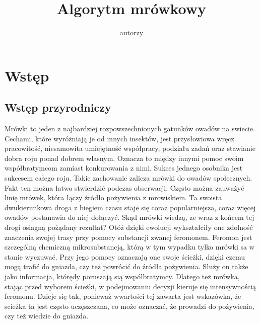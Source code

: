 \documentclass[printmode, openany, oneside, eng]{mgr}
\title{Algorytm mrówkowy}
\author{autorzy}
\begin{document}

\maketitle %
\chapter{Wstęp} \label{chap:wstep}

\section{Wstęp przyrodniczy}\label{sec:przedmowa}
Mrówki  to jeden z najbardziej rozpowszechnionych gatunków owadów na swiecie. Cechami, które wyróżniają je od innych
insektów, jest przysłowiowa wręcz pracowitość, niesamowita umiejętność współpracy, podziału zadań oraz stawianie dobra roju
ponad dobrem wlasnym. Oznacza to między innymi pomoc swoim współbratymcom zamiast konkurowania z nimi. Sukces jednego
osobnika jest sukcesem całego roju. Takie zachowanie zalicza mrówki do owadów społecznych.
Fakt ten można łatwo stwierdzić podczas obserwacji. Często można zauważyć linię mrówek, która łączy źródło
pożywienia z mrowiskiem. Ta swoista dwukierunkowa droga z biegiem czasu staje się coraz popularniejsza, coraz więcej
owadów postanawia do niej dołączyć. Skąd mrówki wiedzą, ze wraz z końcem tej drogi osiagną pożądany rezultat? Otóż dzięki ewolucji wykształciły one zdolność znaczenia swojej trasy przy pomocy substancji zwanej feromonem.
\newline Feromon jest szczególną chemiczną mikrosubstancją, którą w tym wypadku tylko mrówki sa w stanie wyczuwać. Przy jego pomocy oznaczają one swoje ścieżki, dzięki czemu mogą trafić do gniazda, czy też powrócić do źródła pożywienia. Służy on także jako informacja, którędy poruszają sią współbratymcy. Dlatego też mrówka, stając przed wyborem ścieżki, w podejmowaniu decyzji kieruje się intensywnością feromonu. Dzieje się tak, ponieważ wwartości tej zawarta jest wskazówka, że scieżka ta jest często uczęszczana, co może oznaczać, że prowadzi do pożywienia, czy też wiedzie do gniazda.
\end{document}
